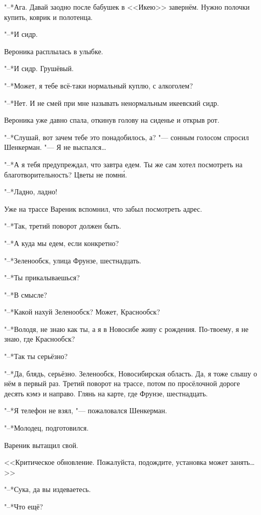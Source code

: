 "--*Ага.
Давай заодно после бабушек в <<Икею>> завернём.
Нужно полочки купить, коврик и полотенца.

"--*И сидр.

Вероника расплылась в улыбке.

"--*И сидр.
Грушёвый.

"--*Может, я тебе всё-таки нормальный куплю, с алкоголем?

"--*Нет.
И не смей при мне называть ненормальным икеевский сидр.

\asterism

\textspace

\label{Sun_2012_05_13}

Вероника уже давно спала, откинув голову на сиденье и открыв рот.

"--*Слушай, вот зачем тебе это понадобилось, а? "--- сонным голосом спросил Шенкерман.
"--- Я не выспался\ldots{}

"--*А я тебя предупреждал, что завтра едем.
Ты же сам хотел посмотреть на благотворительность?
Цветы не помн\'и.

"--*Ладно, ладно!

Уже на трассе Вареник вспомнил, что забыл посмотреть адрес.

"--*Так, третий поворот должен быть.

"--*А куда мы едем, если конкретно?

"--*Зеленообск, улица Фрунзе, шестнадцать.

"--*Ты прикалываешься?

"--*В смысле?

"--*Какой нахуй Зеленообск?
Может, Краснообск?

"--*Володя, не знаю как ты, а я в Новосибе живу с рождения.
По-твоему, я не знаю, где Краснообск?

"--*Так ты серьёзно?

"--*Да, блядь, серьёзно.
Зеленообск, Новосибирская область.
Да, я тоже слышу о нём в первый раз.
Третий поворот на трассе, потом по просёлочной дороге десять кэмэ и направо.
Глянь на карте, где Фрунзе, шестнадцать.

"--*Я телефон не взял, "--- пожаловался Шенкерман.

"--*Молодец, подготовился.

Вареник вытащил свой.

<<Критическое обновление.
Пожалуйста, подождите, установка может занять\ldots{}>>

"--*Сука, да вы издеваетесь.

"--*Что ещё?


